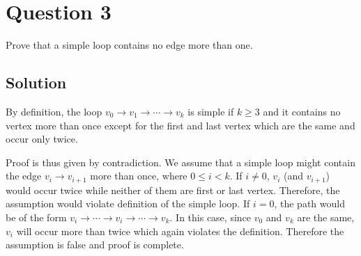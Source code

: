 
\section*{Question 3}
Prove that a simple loop contains no edge more than one.

\subsection*{Solution}
By definition, the loop $v_0 \rightarrow v_1 \rightarrow \cdots \rightarrow v_k$ is simple if $k \geq 3$ and it contains no vertex more than once except for the first and last vertex which are the same and occur only twice.

Proof is thus given by contradiction. We assume that a simple loop might contain the edge $v_i \rightarrow v_{i+1}$ more than once, where $0 \leq i < k$. If $i \neq 0$, $v_i$ (and $v_{i+1}$) would occur twice while neither of them are first or last vertex. Therefore, the assumption would violate definition of the simple loop. If $i = 0$, the path would be of the form $v_i \rightarrow \cdots \rightarrow v_i \rightarrow \cdots \rightarrow v_k$. In this case, since $v_0$ and $v_k$ are the same, $v_i$ will occur more than twice which again violates the definition. Therefore the assumption is false and proof is complete.
